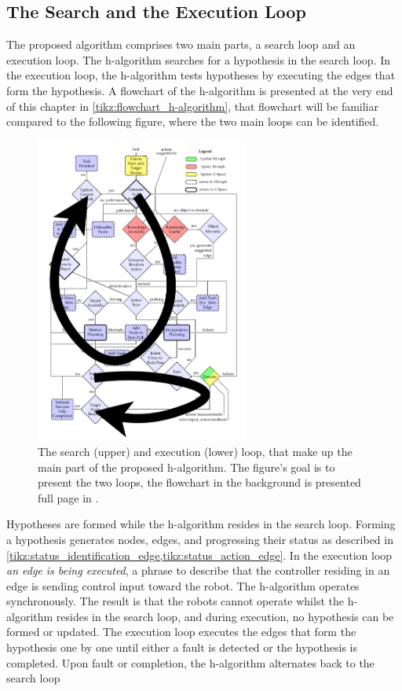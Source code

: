 \subsection{The Search and the Execution Loop}
The proposed algorithm comprises two main parts, a search loop and an execution loop. The \ac{h-algorithm} searches for a hypothesis in the search loop. In the execution loop, the \ac{h-algorithm} tests hypotheses by executing the edges that form the hypothesis. A flowchart  of the \ac{h-algorithm} is presented at the very end of this chapter in \cref{tikz:flowchart_h-algorithm}, that flowchart will be familiar compared to the following figure, where the two main loops can be identified.\bs

\begin{figure}[H]
    \centering
    \includegraphics[width=7cm]{figures/proposed_method/two_loops_identified}
  \caption{The search (upper) and execution (lower) loop, that make up the main part of the proposed \ac{h-algorithm}. The figure's goal is to present the two loops, the flowchart in the background is presented full page in .}%
    \label{fig:two_loops_identified}
\end{figure}

Hypotheses are formed while the \ac{h-algorithm} resides in the search loop. Forming a hypothesis generates nodes, edges, and progressing their status as described in \cref{tikz:status_identification_edge,tikz:status_action_edge}. In the execution loop \textit{an edge is being executed}, a phrase to describe that the controller residing in an edge is sending control input toward the robot. The \ac{h-algorithm} operates synchronously. The result is that the robots cannot operate whilst the \ac{h-algorithm} resides in the search loop, and during execution, no hypothesis can be formed or updated. The execution loop executes the edges that form the hypothesis one by one until either a fault is detected or the hypothesis is completed. Upon fault or completion, the \ac{h-algorithm} alternates back to the search loop\bs

